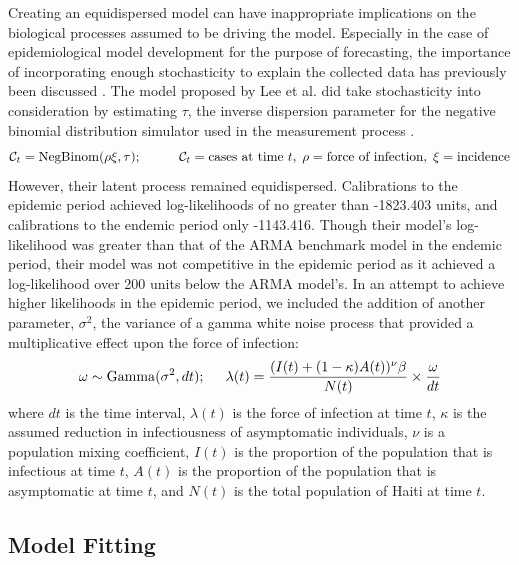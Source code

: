 \documentclass[12pt]{article}
\begin{document}
 Creating an equidispersed model can have inappropriate implications on the biological processes assumed to be driving the model. Especially in the case of epidemiological model development for the purpose of forecasting, the importance of incorporating enough stochasticity to explain the collected data has previously been discussed \cite{Breto_timeseriesmech, King_av}. The model proposed by Lee et al. did take stochasticity into consideration by estimating $\tau$, the inverse dispersion parameter for the negative binomial distribution simulator used in the measurement process \cite{King_statinfpomp, Lee_supp}.
        \begin{equation}
        \mathcal{C}_t = \textrm{NegBinom}(\rho \xi, \tau); \hspace{10mm} \mathcal{C}_t = \textrm{cases at time } t, \hspace{1mm} \rho = \textrm{force of infection}, \hspace{1mm} \xi = \textrm{incidence}
        \end{equation}
\noindent However, their latent process remained equidispersed. Calibrations to the epidemic period achieved log-likelihoods of no greater than -1823.403 units, and calibrations to the endemic period only -1143.416. Though their model's log-likelihood was greater than that of the ARMA benchmark model in the endemic period, their model was not competitive in the epidemic period as it achieved a log-likelihood over 200 units below the ARMA model's. In an attempt to achieve higher likelihoods in the epidemic period, we included the addition of another parameter, $\sigma^2$, the variance of a gamma white noise process that provided a multiplicative effect upon the force of infection:
        \begin{equation}
        \omega \sim \mathrm{Gamma}(\sigma^2, dt); \hspace{5mm}
        \lambda(t) = \frac{(I(t) + (1 - \kappa)A(t))^{\nu}\beta}{N(t)} \times \frac{\omega}{dt}
        \end{equation}
\noindent where $dt$ is the time interval, $\lambda(t)$ is the force of infection at time $t$, $\kappa$ is the assumed reduction in infectiousness of asymptomatic individuals, $\nu$ is a population mixing coefficient, $I(t)$ is the proportion of the population that is infectious at time $t$, $A(t)$ is the proportion of the population that is asymptomatic at time $t$, and $N(t)$ is the total population of Haiti at time $t$.

\subsection{Model Fitting}
\end{document}

